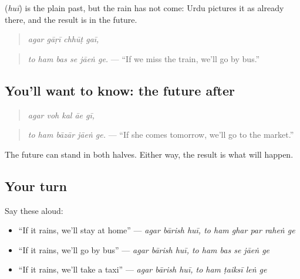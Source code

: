 \textbf{} (\emph{huī}) is the plain past, but the rain has not come: Urdu pictures it as already there, and the result is in the future.

\begin{quote}
\textbf{   }
\end{quote}

\begin{quote}
\emph{agar gāṛī chhūṭ gaī,}
\end{quote}

\begin{quote}
\textbf{     }
\end{quote}

\begin{quote}
\emph{to ham bas se jāeṅ ge.} — \textquotedblleft{}If we miss the train, we'll go by bus.\textquotedblright{}
\end{quote}

\subsection*{You'll want to know: the future after }
\begin{quote}
\textbf{    }
\end{quote}

\begin{quote}
\emph{agar voh kal āe gī,}
\end{quote}

\begin{quote}
\textbf{    }
\end{quote}

\begin{quote}
\emph{to ham bāzār jāeṅ ge.} — \textquotedblleft{}If she comes tomorrow, we'll go to the market.\textquotedblright{}
\end{quote}

The future can stand in both halves. Either way, the result is what will happen.

\subsection*{Your turn}
Say these aloud:

\begin{itemize}
\raggedright
  \item \textquotedblleft{}If it rains, we'll stay at home\textquotedblright{} — \emph{agar bārish huī, to ham ghar par raheṅ ge}
  \item \textquotedblleft{}If it rains, we'll go by bus\textquotedblright{} — \emph{agar bārish huī, to ham bas se jāeṅ ge}
  \item \textquotedblleft{}If it rains, we'll take a taxi\textquotedblright{} — \emph{agar bārish huī, to ham ṭaiksī leṅ ge}
\end{itemize}


